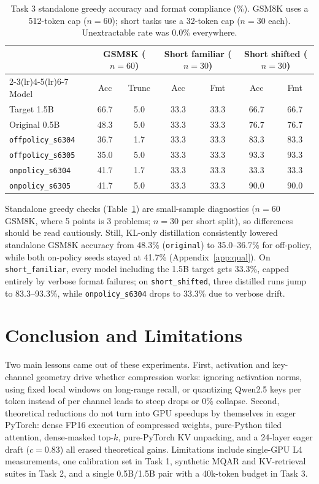 \documentclass{article}
\begin{document}
\begin{table}[t]
\centering\footnotesize
\caption{Task 3 standalone greedy accuracy and format compliance (\%). GSM8K uses a 512-token cap ($n=60$); short tasks use a 32-token cap ($n=30$ each). Unextractable rate was 0.0\% everywhere.}
\label{tab:t3acc}
\begin{tabular}{lcccccc}
\toprule
 & \multicolumn{2}{c}{GSM8K ($n=60$)} & \multicolumn{2}{c}{Short familiar ($n=30$)} & \multicolumn{2}{c}{Short shifted ($n=30$)} \\
\cmidrule(lr){2-3}\cmidrule(lr){4-5}\cmidrule(lr){6-7}
Model & Acc & Trunc & Acc & Fmt & Acc & Fmt \\
\midrule
Target 1.5B & 66.7 & 5.0 & 33.3 & 33.3 & 66.7 & 66.7 \\
Original 0.5B & 48.3 & 5.0 & 33.3 & 33.3 & 76.7 & 76.7 \\
\texttt{offpolicy\_s6304} & 36.7 & 1.7 & 33.3 & 33.3 & 83.3 & 83.3 \\
\texttt{offpolicy\_s6305} & 35.0 & 5.0 & 33.3 & 33.3 & 93.3 & 93.3 \\
\texttt{onpolicy\_s6304} & 41.7 & 1.7 & 33.3 & 33.3 & 33.3 & 33.3 \\
\texttt{onpolicy\_s6305} & 41.7 & 5.0 & 33.3 & 33.3 & 90.0 & 90.0 \\
\bottomrule
\end{tabular}
\end{table}

Standalone greedy checks (Table~\ref{tab:t3acc}) are small-sample diagnostics ($n=60$ GSM8K, where 5 points is 3 problems; $n=30$ per short split), so differences should be read cautiously. Still, KL-only distillation consistently lowered standalone GSM8K accuracy from 48.3\% (\texttt{original}) to 35.0--36.7\% for off-policy, while both on-policy seeds stayed at 41.7\% (Appendix~\ref{app:qual}). On \texttt{short\_familiar}, every model including the 1.5B target gets 33.3\%, capped entirely by verbose format failures; on \texttt{short\_shifted}, three distilled runs jump to 83.3--93.3\%, while \texttt{onpolicy\_s6304} drops to 33.3\% due to verbose drift.

\section{Conclusion and Limitations}
Two main lessons came out of these experiments. First, activation and key-channel geometry drive whether compression works: ignoring activation norms, using fixed local windows on long-range recall, or quantizing Qwen2.5 keys per token instead of per channel leads to steep drops or 0\% collapse. Second, theoretical reductions do not turn into GPU speedups by themselves in eager PyTorch: dense FP16 execution of compressed weights, pure-Python tiled attention, dense-masked top-$k$, pure-PyTorch KV unpacking, and a 24-layer eager draft ($c=0.83$) all erased theoretical gains. Limitations include single-GPU L4 measurements, one calibration set in Task 1, synthetic MQAR and KV-retrieval suites in Task 2, and a single 0.5B/1.5B pair with a 40k-token budget in Task 3.
\end{document}
